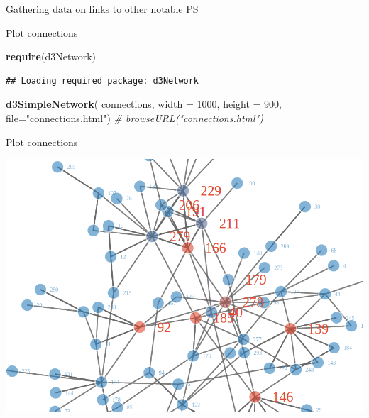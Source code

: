 \documentclass[ignorenonframetext,]{beamer}
\newenvironment{Shaded}{\begin{snugshade}}{\end{snugshade}}
\newcommand{\KeywordTok}[1]{\textcolor[rgb]{0.13,0.29,0.53}{\textbf{{#1}}}}
\newcommand{\DataTypeTok}[1]{\textcolor[rgb]{0.13,0.29,0.53}{{#1}}}
\newcommand{\DecValTok}[1]{\textcolor[rgb]{0.00,0.00,0.81}{{#1}}}
\newcommand{\StringTok}[1]{\textcolor[rgb]{0.31,0.60,0.02}{{#1}}}
\newcommand{\CommentTok}[1]{\textcolor[rgb]{0.56,0.35,0.01}{\textit{{#1}}}}
\newcommand{\NormalTok}[1]{{#1}}
\begin{document}
\begin{frame}[fragile]{Gathering data on links to other notable PS}

\begin{Shaded}
\end{Shaded}

\end{frame}

\begin{frame}[fragile]{Plot connections}

\begin{Shaded}
\begin{Highlighting}[]
\KeywordTok{require}\NormalTok{(d3Network)}
\end{Highlighting}
\end{Shaded}

\begin{verbatim}
## Loading required package: d3Network
\end{verbatim}

\begin{Shaded}
\begin{Highlighting}[]
\KeywordTok{d3SimpleNetwork}\NormalTok{( connections, }
                 \DataTypeTok{width =} \DecValTok{1000}\NormalTok{, }
                 \DataTypeTok{height =} \DecValTok{900}\NormalTok{, }
                 \DataTypeTok{file=}\StringTok{"connections.html"}\NormalTok{)}
\CommentTok{# browseURL("connections.html")}
\end{Highlighting}
\end{Shaded}

\end{frame}

\begin{frame}{Plot connections}

\includegraphics{fig/network1.png}

\end{frame}
\end{document}
